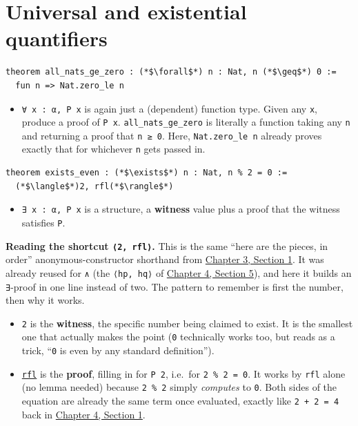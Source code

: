 \section{Universal and existential quantifiers}\label{sec:04-propositions-and-proofs:06-quantifiers:1}

\begin{lstlisting}
theorem all_nats_ge_zero : (*$\forall$*) n : Nat, n (*$\geq$*) 0 :=
  fun n => Nat.zero_le n
\end{lstlisting}

\begin{itemize}
\tightlist
\item
  \texttt{∀ x : α, P x} is again just a (dependent) function type. Given any \texttt{x}, produce a proof of \texttt{P x}. \texttt{all\_\allowbreak{}nats\_\allowbreak{}ge\_\allowbreak{}zero} is literally a function taking any \texttt{n} and returning a proof that \texttt{n ≥ 0}. Here, \texttt{Nat.zero\_\allowbreak{}le n} already proves exactly that for whichever \texttt{n} gets passed in.
\end{itemize}

\begin{lstlisting}
theorem exists_even : (*$\exists$*) n : Nat, n % 2 = 0 :=
  (*$\langle$*)2, rfl(*$\rangle$*)
\end{lstlisting}

\begin{itemize}
\tightlist
\item
  \texttt{∃ x : α, P x} is a structure, a \textbf{witness} value plus a proof that the witness satisfies \texttt{P}.
\end{itemize}

\textbf{Reading the shortcut \texttt{⟨2, rfl⟩}.} This is the same ``here are the pieces, in order'' anonymous-constructor shorthand from \hyperref[sec:03-functions-and-structures:01-structure-basics:1]{Chapter 3, Section 1}. It was already reused for \texttt{∧} (the \texttt{⟨hp, hq⟩} of \hyperref[sec:04-propositions-and-proofs:05-and-or-not:1]{Chapter 4, Section 5}), and here it builds an \texttt{∃}-proof in one line instead of two. The pattern to remember is first the number, then why it works.

\begin{itemize}
\tightlist
\item
  \texttt{2} is the \textbf{witness}, the specific number being claimed to exist. It is the smallest one that actually makes the point (\texttt{0} technically works too, but reads as a trick, ``\texttt{0} is even by any standard definition'').
\item
  \href{https://lean-lang.org/doc/reference/latest/Tactic-Proofs/Tactic-Reference/}{\texttt{rfl}} is the \textbf{proof}, filling in for \texttt{P 2}, i.e.~for \texttt{2 \% 2 = 0}. It works by \texttt{rfl} alone (no lemma needed) because \texttt{2 \% 2} simply \emph{computes} to \texttt{0}. Both sides of the equation are already the same term once evaluated, exactly like \texttt{2 + 2 = 4} back in \hyperref[sec:04-propositions-and-proofs:01-prop:1]{Chapter 4, Section 1}.
\end{itemize}


